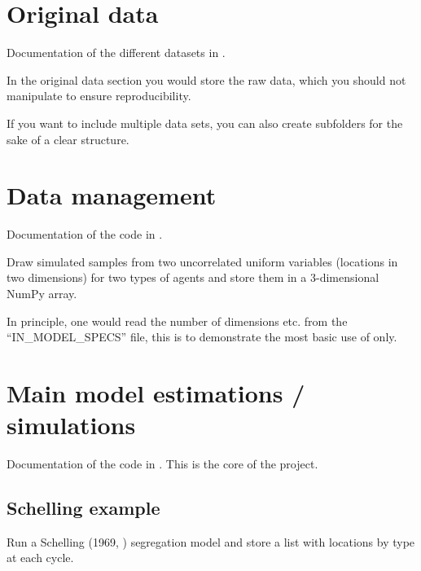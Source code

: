 \documentclass[a4paper,11pt,english]{sphinxmanual}
\begin{document}
\chapter{Original data}
\label{\detokenize{original_data:original-data}}\label{\detokenize{original_data:id1}}\label{\detokenize{original_data::doc}}
Documentation of the different datasets in .

In the original data section you would store the raw data, which you should not manipulate to ensure reproducibility.

If you want to include multiple data sets, you can also create subfolders for the sake of a clear structure.


\chapter{Data management}
\label{\detokenize{data_management:data-management}}\label{\detokenize{data_management:id1}}\label{\detokenize{data_management::doc}}
Documentation of the code in .

\label{\detokenize{data_management:module-src.data_management.get_simulation_draws}}
Draw simulated samples from two uncorrelated uniform variables
(locations in two dimensions) for two types of agents and store
them in a 3-dimensional NumPy array.

 In principle, one would read the number of dimensions etc.
from the “IN\_MODEL\_SPECS” file, this is to demonstrate the most basic
use of  only.


\chapter{Main model estimations / simulations}
\label{\detokenize{analysis:main-model-estimations-simulations}}\label{\detokenize{analysis:analysis}}\label{\detokenize{analysis::doc}}
Documentation of the code in . This is the core of the project.


\section{Schelling example}
\label{\detokenize{analysis:module-src.analysis.schelling}}\label{\detokenize{analysis:schelling-example}}
Run a Schelling (1969, ) segregation
model and store a list with locations by type at each cycle.
\end{document}

